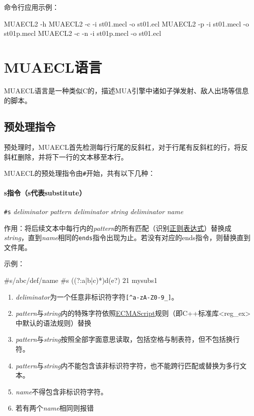 \documentclass[UTF8]{ctexart}
\begin{document}
命令行应用示例：

\begin{MUAvbt}
MUAECL2 -h
MUAECL2 -c -i st01.mecl -o st01.ecl
MUAECL2 -p -i st01.mecl -o st01p.mecl
MUAECL2 -c -n -i st01p.mecl -o st01.ecl
\end{MUAvbt}

\section{MUAECL语言}

MUAECL语言是一种类似C的，描述MUA引擎中诸如子弹发射、敌人出场等信息的脚本。

\subsection{预处理指令}

预处理时，MUAECL首先检测每行行尾的反斜杠，对于行尾有反斜杠的行，将反斜杠删除，并将下一行的文本移至本行。

MUAECL的预处理指令由\verb|#|开始，共有以下几种：

\paragraph{s指令（s代表substitute）} \verb|#s| \textit{deliminator pattern deliminator string deliminator name}

作用：将后续文本中每行内的\textit{pattern}的所有匹配（识别\href{https://en.wikipedia.org/wiki/Regular_expression}{正则表达式}）替换成\textit{string}，直到\textit{name}相同的\verb|ends|指令出现为止。若没有对应的ends指令，则替换直到文件尾。

示例：

\begin{MUAvbt}
#s/abc/def/name
#s ((?:a|b|c)*)d(e?) $2$1 mysubs1
\end{MUAvbt}

\begin{enumerate}
	\item \textit{deliminator}为一个任意非标识符字符\verb|[^a-zA-Z0-9_]|。
	\item \textit{pattern}与\textit{string}内的特殊字符依照\href{https://zh.cppreference.com/w/cpp/regex/ecmascript}{ECMAScript}规则（即C++标准库<reg\_ex>中默认的语法规则）替换
	\item \textit{pattern}与\textit{string}按照全部字面意思读取，包括空格与制表符，但不包括换行符。
	\item \textit{pattern}与\textit{string}内不能包含该非标识符字符，也不能跨行匹配或替换为多行文本。
	\item \textit{name}不得包含非标识符字符。
	\item 若有两个\textit{name}相同则报错
\end{enumerate}
\end{document}
